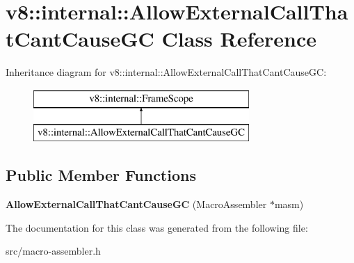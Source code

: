 \hypertarget{classv8_1_1internal_1_1_allow_external_call_that_cant_cause_g_c}{}\section{v8\+:\+:internal\+:\+:Allow\+External\+Call\+That\+Cant\+Cause\+G\+C Class Reference}
\label{classv8_1_1internal_1_1_allow_external_call_that_cant_cause_g_c}
Inheritance diagram for v8\+:\+:internal\+:\+:Allow\+External\+Call\+That\+Cant\+Cause\+G\+C\+:\begin{figure}[H]
\begin{center}
\leavevmode
\includegraphics[height=2.000000cm]{classv8_1_1internal_1_1_allow_external_call_that_cant_cause_g_c}
\end{center}
\end{figure}
\subsection*{Public Member Functions}
\begin{DoxyCompactItemize}
\item 
\hypertarget{classv8_1_1internal_1_1_allow_external_call_that_cant_cause_g_c_ae136159f715f0afd4a7f76629f7bca48}{}{\bfseries Allow\+External\+Call\+That\+Cant\+Cause\+G\+C} (Macro\+Assembler $\ast$masm)\label{classv8_1_1internal_1_1_allow_external_call_that_cant_cause_g_c_ae136159f715f0afd4a7f76629f7bca48}

\end{DoxyCompactItemize}


The documentation for this class was generated from the following file\+:\begin{DoxyCompactItemize}
\item 
src/macro-\/assembler.\+h\end{DoxyCompactItemize}
